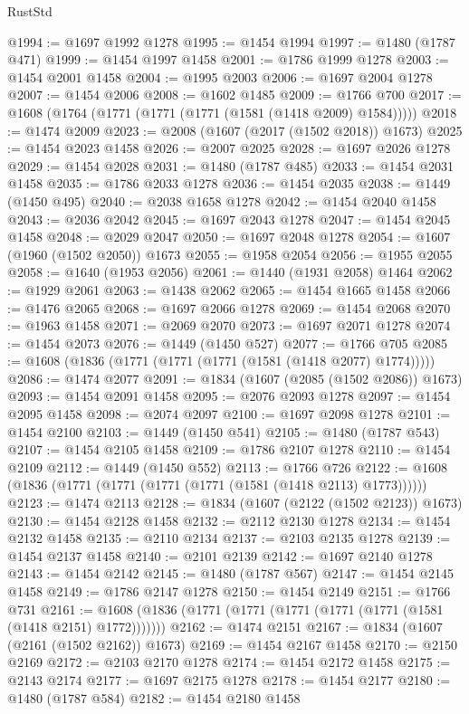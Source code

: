 \begin{lexlean}{RustStd}
\begin{coremodule}
{\begin{coremodule}
{{{{{{{{{{{{{{{{{{{{{{{{{{{{{{{@1994 := @1697 @1992 @1278
@1995 := @1454 @1994
@1997 := @1480 (@1787 @471)
@1999 := @1454 @1997 @1458
@2001 := @1786 @1999 @1278
@2003 := @1454 @2001 @1458
@2004 := @1995 @2003
@2006 := @1697 @2004 @1278
@2007 := @1454 @2006
@2008 := @1602 @1485
@2009 := @1766 @700
@2017 := @1608 (@1764 (@1771 (@1771 (@1771 (@1581 (@1418 @2009) @1584)))))
@2018 := @1474 @2009
@2023 := @2008 (@1607 (@2017 (@1502 @2018)) @1673)
@2025 := @1454 @2023 @1458
@2026 := @2007 @2025
@2028 := @1697 @2026 @1278
@2029 := @1454 @2028
@2031 := @1480 (@1787 @485)
@2033 := @1454 @2031 @1458
@2035 := @1786 @2033 @1278
@2036 := @1454 @2035
@2038 := @1449 (@1450 @495)
@2040 := @2038 @1658 @1278
@2042 := @1454 @2040 @1458
@2043 := @2036 @2042
@2045 := @1697 @2043 @1278
@2047 := @1454 @2045 @1458
@2048 := @2029 @2047
@2050 := @1697 @2048 @1278
@2054 := @1607 (@1960 (@1502 @2050)) @1673
@2055 := @1958 @2054
@2056 := @1955 @2055
@2058 := @1640 (@1953 @2056)
@2061 := @1440 (@1931 @2058) @1464
@2062 := @1929 @2061
@2063 := @1438 @2062
@2065 := @1454 @1665 @1458
@2066 := @1476 @2065
@2068 := @1697 @2066 @1278
@2069 := @1454 @2068
@2070 := @1963 @1458
@2071 := @2069 @2070
@2073 := @1697 @2071 @1278
@2074 := @1454 @2073
@2076 := @1449 (@1450 @527)
@2077 := @1766 @705
@2085 := @1608 (@1836 (@1771 (@1771 (@1771 (@1581 (@1418 @2077) @1774)))))
@2086 := @1474 @2077
@2091 := @1834 (@1607 (@2085 (@1502 @2086)) @1673)
@2093 := @1454 @2091 @1458
@2095 := @2076 @2093 @1278
@2097 := @1454 @2095 @1458
@2098 := @2074 @2097
@2100 := @1697 @2098 @1278
@2101 := @1454 @2100
@2103 := @1449 (@1450 @541)
@2105 := @1480 (@1787 @543)
@2107 := @1454 @2105 @1458
@2109 := @1786 @2107 @1278
@2110 := @1454 @2109
@2112 := @1449 (@1450 @552)
@2113 := @1766 @726
@2122 := @1608 (@1836 (@1771 (@1771 (@1771 (@1771 (@1581 (@1418 @2113) @1773))))))
@2123 := @1474 @2113
@2128 := @1834 (@1607 (@2122 (@1502 @2123)) @1673)
@2130 := @1454 @2128 @1458
@2132 := @2112 @2130 @1278
@2134 := @1454 @2132 @1458
@2135 := @2110 @2134
@2137 := @2103 @2135 @1278
@2139 := @1454 @2137 @1458
@2140 := @2101 @2139
@2142 := @1697 @2140 @1278
@2143 := @1454 @2142
@2145 := @1480 (@1787 @567)
@2147 := @1454 @2145 @1458
@2149 := @1786 @2147 @1278
@2150 := @1454 @2149
@2151 := @1766 @731
@2161 := @1608 (@1836 (@1771 (@1771 (@1771 (@1771 (@1771 (@1581 (@1418 @2151) @1772)))))))
@2162 := @1474 @2151
@2167 := @1834 (@1607 (@2161 (@1502 @2162)) @1673)
@2169 := @1454 @2167 @1458
@2170 := @2150 @2169
@2172 := @2103 @2170 @1278
@2174 := @1454 @2172 @1458
@2175 := @2143 @2174
@2177 := @1697 @2175 @1278
@2178 := @1454 @2177
@2180 := @1480 (@1787 @584)
@2182 := @1454 @2180 @1458
}}}}}}}}}}}}}}}}}}}}}}}}}}}}}}}
\end{coremodule}}
\end{coremodule}
\end{lexlean}
